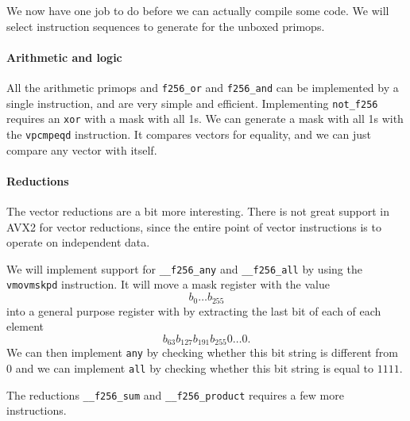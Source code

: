 \documentclass{article}
\begin{document}
We now have one job to do before we can actually compile some code. We will select instruction sequences to generate for the unboxed primops.

\paragraph{Arithmetic and logic}
All the arithmetic primops and \verb!f256_or! and \verb!f256_and! can be implemented by a single instruction, and are very simple and efficient. Implementing \verb!not_f256! requires an \verb!xor! with a mask with all 1s. We can generate a mask with all 1s with the \verb!vpcmpeqd! instruction. It compares vectors for equality, and we can just compare any vector with itself.

\paragraph{Reductions}
The vector reductions are a bit more interesting. There is not great support in AVX2 for vector reductions, since the entire point of vector instructions is to operate on independent data.

We will implement support for \verb!__f256_any! and \verb!__f256_all! by using the \verb!vmovmskpd! instruction. It will move a mask register with the value
\[
    b_0 \ldots b_{255}
\]
into a general purpose register with by extracting the last bit of each of each element
\[
    b_{63}b_{127}b_{191}b_{255}0\ldots0.
\]
We can then implement \verb!any! by checking whether this bit string is different from 0 and we can implement \verb!all! by checking whether this bit string is equal to $1111$.

The reductions \verb!__f256_sum! and \verb!__f256_product! requires a few more instructions.
\end{document}
